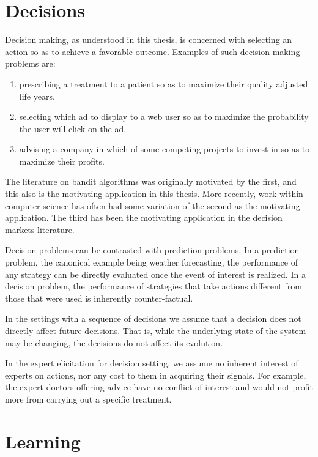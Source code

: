 \section{Decisions}

Decision making, as understood in this thesis, is concerned with selecting an action so as to achieve a favorable outcome.
Examples of such decision making problems are:

\begin{enumerate}
	\item  prescribing a treatment to a patient so as to maximize their quality adjusted life years.
	\item selecting which ad to display to a web user so as to maximize the probability the user will click on the ad.
	\item advising a company in which of some competing projects to invest in so as to maximize their profits.
\end{enumerate}

The literature on bandit algorithms was originally motivated by the first, and this also is the motivating application in this thesis. More recently, work within computer science has often had some variation of the second as the motivating application. The third has been the motivating application in the decision markets literature.

Decision problems can be contrasted with prediction problems.
In a prediction problem, the canonical example being weather forecasting, the performance of any strategy can be directly evaluated once the event of interest is realized.
In a decision problem, the performance of strategies that take actions different from those that were used is inherently counter-factual.

In the settings with a sequence of decisions we assume that a decision does not directly affect  future decisions. That is, while the underlying state of the system may be changing, the decisions do not affect its evolution.

In the expert elicitation for decision setting, we assume no inherent interest of experts on actions, nor any cost to them in acquiring their signals.
For example, the expert doctors offering advice have no conflict of interest and would not profit more from carrying out a specific treatment.

\section{Learning}


